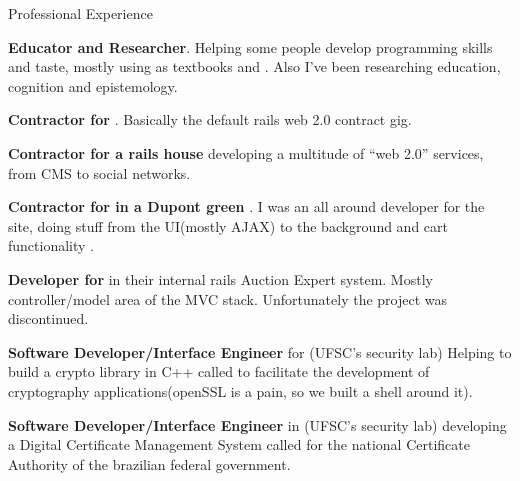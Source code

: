 \begin{rubric}{Professional Experience} 
    

    \entry*[2009]%
        \textbf{Educator and Researcher}. Helping some people develop 
        programming skills and taste, mostly using as textbooks
         and
        .
        Also I've been researching education, cognition and epistemology.

    \entry*[2009]%
        \textbf{Contractor for
        }. Basically the
        default rails web 2.0 contract gig.

    \entry*[2007 - 2008]%
        \textbf{Contractor for  a rails house} 
        developing a multitude of ``web 2.0'' services, from CMS to social networks.

    \entry*[2007]%
        \textbf{Contractor for  
        in a Dupont green }.
        I was an all around developer for the site, doing stuff from the
        UI(mostly AJAX) to the background and cart functionality .

    \entry*[2007]%
        \textbf{Developer for } 
        in their internal rails Auction Expert system. Mostly controller/model area of
        the MVC stack. Unfortunately the project was discontinued.

    \entry*[2005 - 2007]%
        \textbf{Software Developer/Interface Engineer} for 
        (UFSC's security lab) Helping
        to build a crypto library in C++ called  
        to facilitate the development of cryptography
        applications(openSSL is a pain, so we built a shell around it).

    \entry*[2005 - 2007]%
        \textbf{Software Developer/Interface Engineer} in 
        (UFSC's security lab) developing a
        Digital Certificate Management System  called
         for the national
        Certificate Authority of the brazilian federal government.

\end{rubric}
